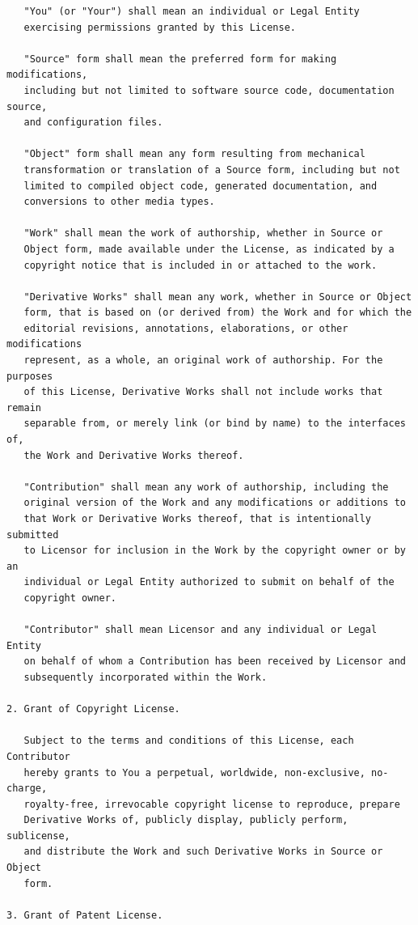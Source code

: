 \documentclass[12pt,a4paper]{article}
\theoremstyle{definition}
\theoremstyle{remark}
\begin{document}
\begin{verbatim}
   "You" (or "Your") shall mean an individual or Legal Entity
   exercising permissions granted by this License.

   "Source" form shall mean the preferred form for making modifications,
   including but not limited to software source code, documentation source,
   and configuration files.

   "Object" form shall mean any form resulting from mechanical
   transformation or translation of a Source form, including but not
   limited to compiled object code, generated documentation, and
   conversions to other media types.

   "Work" shall mean the work of authorship, whether in Source or
   Object form, made available under the License, as indicated by a
   copyright notice that is included in or attached to the work.

   "Derivative Works" shall mean any work, whether in Source or Object
   form, that is based on (or derived from) the Work and for which the
   editorial revisions, annotations, elaborations, or other modifications
   represent, as a whole, an original work of authorship. For the purposes
   of this License, Derivative Works shall not include works that remain
   separable from, or merely link (or bind by name) to the interfaces of,
   the Work and Derivative Works thereof.

   "Contribution" shall mean any work of authorship, including the
   original version of the Work and any modifications or additions to
   that Work or Derivative Works thereof, that is intentionally submitted
   to Licensor for inclusion in the Work by the copyright owner or by an
   individual or Legal Entity authorized to submit on behalf of the
   copyright owner.

   "Contributor" shall mean Licensor and any individual or Legal Entity
   on behalf of whom a Contribution has been received by Licensor and
   subsequently incorporated within the Work.

2. Grant of Copyright License.

   Subject to the terms and conditions of this License, each Contributor
   hereby grants to You a perpetual, worldwide, non-exclusive, no-charge,
   royalty-free, irrevocable copyright license to reproduce, prepare
   Derivative Works of, publicly display, publicly perform, sublicense,
   and distribute the Work and such Derivative Works in Source or Object
   form.

3. Grant of Patent License.


\end{verbatim}
\end{document}
